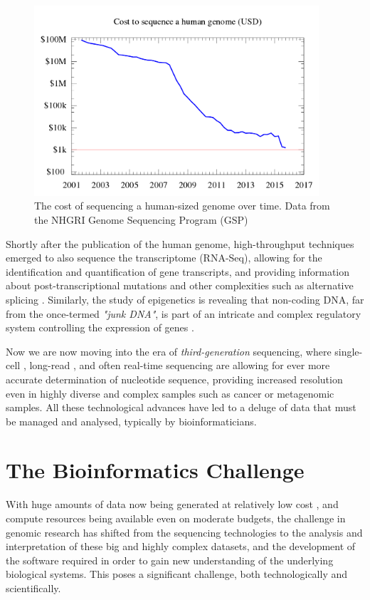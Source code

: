 \begin{justify}
\begin{figure}[h!]
    \centering
    \includegraphics[width=300pt]{chapters/images/Historic_cost_of_sequencing_a_human_genome.png}
    \caption{The cost of sequencing a human-sized genome over time. Data from the NHGRI Genome Sequencing Program (GSP) }
    \label{fig:seqcost}
\end{figure}

Shortly after the publication of the human genome, high-throughput techniques emerged to also sequence the transcriptome (RNA-Seq), allowing for the identification and quantification of gene transcripts, and providing information about post-transcriptional mutations and other complexities such as alternative splicing \cite{wang2009rna}. Similarly, the study of epigenetics is revealing that non-coding DNA, far from the once-termed \textit{"junk DNA"}, is part of an intricate and complex regulatory system controlling the expression of genes \cite{zuckerkandl2007combinatorial}.

Now we are now moving into the era of \emph{third-generation} sequencing, where single-cell \cite{gawad2016single}, long-read \cite{koren2015one}, and often real-time sequencing \cite{flusberg2010direct} are allowing for ever more accurate determination of nucleotide sequence, providing increased resolution even in highly diverse and complex samples such as cancer or metagenomic samples. All these technological advances have led to a deluge of data that must be managed and analysed, typically by bioinformaticians.


\section{The Bioinformatics Challenge}

With huge amounts of data now being generated at relatively low cost \cite{chen2014big}, and compute resources being available even on moderate budgets, the challenge in genomic research has shifted from the sequencing technologies to the analysis and interpretation of these big and highly complex datasets, and the development of the software required in order to gain new understanding of the underlying biological systems. This poses a significant challenge, both technologically and scientifically.



\end{justify}
